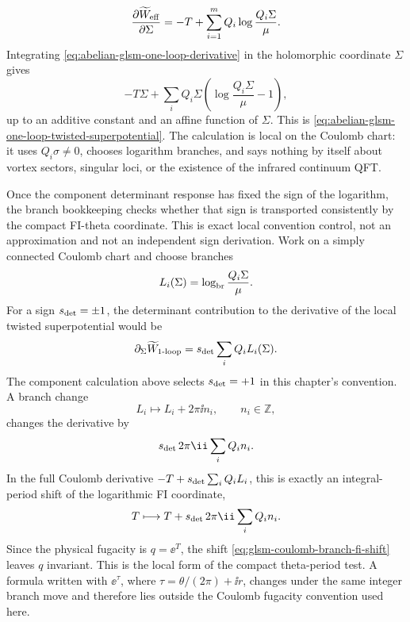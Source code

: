 \begin{equation}
  \frac{\partial \widetilde W_{\rm eff}}{\partial\Sigma}
  =
  -T+\sum_{i=1}^m Q_i\log\frac{Q_i\Sigma}{\mu}.
  \label{eq:abelian-glsm-one-loop-derivative}
\end{equation}
Integrating \eqref{eq:abelian-glsm-one-loop-derivative} in the holomorphic
coordinate \(\Sigma\) gives
\[
  -T\Sigma+\sum_iQ_i\Sigma
  \left(\log\frac{Q_i\Sigma}{\mu}-1\right),
\]
up to an additive constant and an affine function of \(\Sigma\).  This is
\eqref{eq:abelian-glsm-one-loop-twisted-superpotential}.  The calculation is
local on the Coulomb chart: it uses \(Q_i\sigma\neq0\), chooses logarithm
branches, and says nothing by itself about vortex sectors, singular loci, or
the existence of the infrared continuum QFT.

\begin{remark}
\label{rem:glsm-coulomb-one-loop-branch-monodromy}
Once the component determinant response has fixed the sign of the logarithm,
the branch bookkeeping checks whether that sign is transported consistently by
the compact FI-theta coordinate.  This is exact local convention control, not
an approximation and not an independent sign derivation.  Work on a simply
connected Coulomb chart and choose branches
\[
  L_i(\Sigma)=\log_{\rm br}\frac{Q_i\Sigma}{\mu}.
\]
For a sign \(s_{\rm det}=\pm1\), the determinant contribution to the derivative
of the local twisted superpotential would be
\[
  \partial_\Sigma\widetilde W_{\rm 1\text{-}loop}
  =
  s_{\rm det}\sum_i Q_iL_i(\Sigma).
\]
The component calculation above selects \(s_{\rm det}=+1\) in this chapter's
convention.
A branch change
\[
  L_i\longmapsto L_i+2\pi\ii n_i,
  \qquad n_i\in\mathbb Z,
\]
changes the derivative by
\[
  s_{\rm det}\,2\pi\ii\sum_iQ_in_i .
\]
In the full Coulomb derivative
\(-T+s_{\rm det}\sum_iQ_iL_i\), this is exactly an integral-period shift of the
logarithmic FI coordinate,
\begin{equation}
  T\longmapsto T+s_{\rm det}\,2\pi\ii\sum_iQ_in_i .
  \label{eq:glsm-coulomb-branch-fi-shift}
\end{equation}
Since the physical fugacity is \(q=\ee^T\), the shift
\eqref{eq:glsm-coulomb-branch-fi-shift} leaves \(q\) invariant.  This is the
local form of the compact theta-period test.  A formula written with
\(\ee^\tau\), where \(\tau=\theta/(2\pi)+\ii r\), changes under the same
integer branch move and therefore lies outside the Coulomb fugacity convention
used here.


\end{remark}
